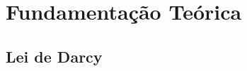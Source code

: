 \documentclass[professionalfont]{beamer}
\begin{document}
    

\section{Fundamentação Teórica}

\subsection{Lei de Darcy}


    
    

\end{document}
